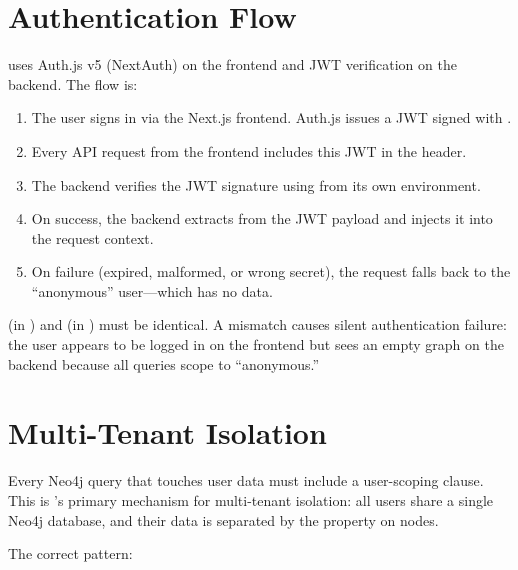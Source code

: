 \section{Authentication Flow}
\label{sec:auth-flow}

\sysname{} uses Auth.js v5 (NextAuth) on the frontend and JWT verification
on the backend.  The flow is:

\begin{enumerate}
    \item The user signs in via the Next.js frontend.  Auth.js issues a
          JWT signed with .
    \item Every API request from the frontend includes this JWT in the
           header.
    \item The backend verifies the JWT signature using
           from its own environment.
    \item On success, the backend extracts  from the JWT
          payload and injects it into the request context.
    \item On failure (expired, malformed, or wrong secret), the request
          falls back to the ``anonymous'' user---which has no data.
\end{enumerate}

\begin{warning}
 (in ) and
 (in ) must be identical.
A mismatch causes silent authentication failure: the user appears to be
logged in on the frontend but sees an empty graph on the backend because
all queries scope to ``anonymous.''
\end{warning}


\section{Multi-Tenant Isolation}
\label{sec:multi-tenant}

Every Neo4j query that touches user data must include a user-scoping
 clause.  This is \sysname{}'s primary mechanism for
multi-tenant isolation: all users share a single Neo4j database, and
their data is separated by the  property on
 nodes.

The correct pattern:

